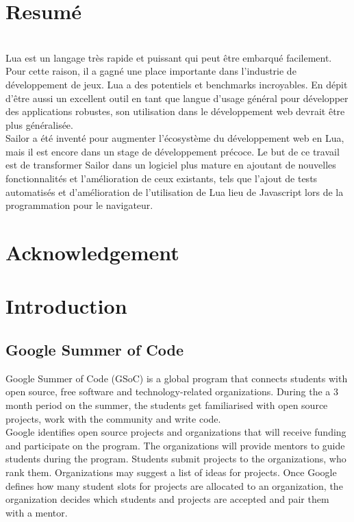 \documentclass{article}
\begin{document}
	\section*{Resumé}\\

Lua est un langage très rapide et puissant qui peut être embarqué facilement. Pour cette raison, il a gagné une place importante dans l'industrie de développement de jeux. Lua a des potentiels et benchmarks incroyables. En dépit d'être aussi un excellent outil en tant que langue d'usage général pour développer des applications robustes, son utilisation dans le développement web devrait être plus généralisée.\\

Sailor a été inventé pour augmenter l'écosystème du développement web en Lua, mais il est encore dans un stage de développement précoce. Le but de ce travail est de transformer Sailor dans un logiciel plus mature en ajoutant de nouvelles fonctionnalités et l'amélioration de ceux existants, tels que l'ajout de tests automatisés et d'amélioration de l'utilisation de Lua lieu de Javascript lors de la programmation pour le navigateur.

\null\newpage
\null\newpage


\section*{Acknowledgement}

\null\newpage
\null\newpage


	\tableofcontents

\null\newpage
\null\newpage


	
	\section{Introduction}

	\subsection{Google Summer of Code}
	Google Summer of Code (GSoC) is a global program that connects students with open source, free software and technology-related organizations. During the a 3 month period on the summer, the students get familiarised with open source projects, work with the community and write code. \\

Google identifies open source projects and organizations that will receive funding and participate on the program. The organizations will provide mentors to guide students during the program. Students submit projects to the organizations, who rank them. Organizations may suggest a list of ideas for projects. Once Google defines how many student slots for projects are allocated to an organization, the organization decides which students and projects are accepted and pair them with a mentor.\\
\end{document}
